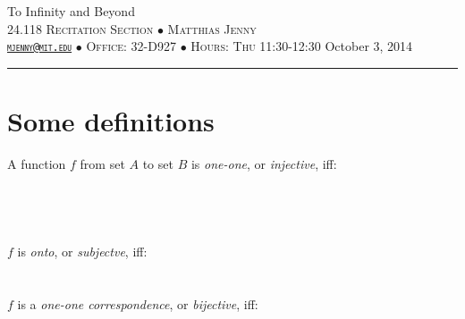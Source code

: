 \documentclass[justified]{tufte-handout}
\newcommand{\HRule}{\rule{\linewidth}{0.1mm}}
\begin{document}
\begin{fullwidth}
\noindent\LARGE To Infinity and Beyond  \normalsize \\[.3cm]
\noindent  \textsc{24.118 Recitation Section $\bullet$ Matthias Jenny\\  {\texttt{\href{mailto:mjenny@mit.edu}{mjenny@mit.edu}}} $\bullet$ Office:  32-D927 $\bullet$ Hours: Thu 11:30-12:30} \hfill{October 3, 2014}
\noindent\HRule
\end{fullwidth}

\section{Some definitions}

\noindent A function $f$ from set $A$ to set $B$ is \emph{one-one}, or \emph{injective}, iff: \underline{\hspace{2.62cm}}\\\\\underline{\hspace{11.48cm}}\\\\\underline{\hspace{11.48cm}}\\

\noindent $f$ is \emph{onto}, or \emph{subjectve}, iff: \underline{\hspace{7.67cm}}\\\\\underline{\hspace{11.48cm}}\\

\noindent $f$ is a \emph{one-one correspondence}, or \emph{bijective}, iff: \underline{\hspace{4.84cm}}\\\\\underline{\hspace{11.48cm}}
\end{document}
